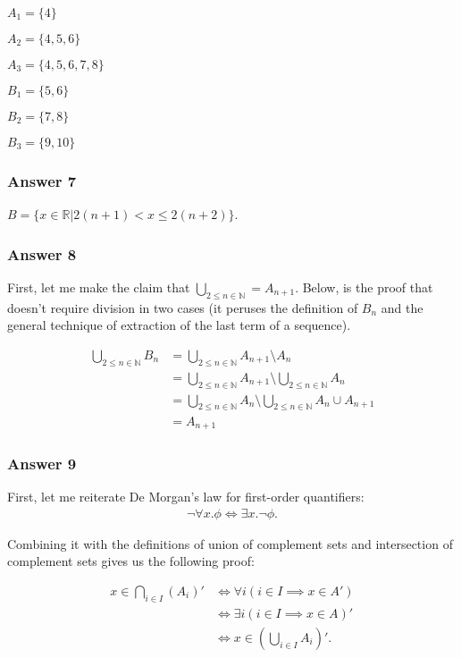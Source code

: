 \documentclass[11pt]{article}
\begin{document}
$A_1=\{4\}$

$A_2=\{4,5,6\}$

$A_3=\{4,5,6,7,8\}$

$B_1=\{5,6\}$

$B_2=\{7,8\}$

$B_3=\{9,10\}$

\subsubsection{Answer 7}
\label{sec-1-4-2}
$B = \{x \in \mathbb{R} | 2(n+1) < x \leq 2(n+2)\}$.
\subsubsection{Answer 8}
\label{sec-1-4-3}
First, let me make the claim that $\bigcup_{2 \leq n \in \mathbb{N}}=A_{n+1}$.
Below, is the proof that doesn't require division in two cases (it peruses
the definition of $B_n$ and the general technique of extraction of the last
term of a sequence).

\begin{equation*}
  \begin{aligned}
    \bigcup_{2 \leq n \in \mathbb{N}} B_n &=
    \bigcup_{2 \leq n \in \mathbb{N}} A_{n+1} \setminus A_n \\
    &= \bigcup_{2 \leq n \in \mathbb{N}} A_{n+1} \setminus
    \bigcup_{2 \leq n \in \mathbb{N}} A_n \\
    &= \bigcup_{2 \leq n \in \mathbb{N}} A_n \setminus
    \bigcup_{2 \leq n \in \mathbb{N}} A_n \cup A_{n+1} \\
    &= A_{n+1}
  \end{aligned}
\end{equation*}
\subsubsection{Answer 9}
\label{sec-1-4-4}
First, let me reiterate De Morgan's law for first-order quantifiers:
\begin{equation*}
  \begin{aligned}
    \lnot \forall x. \phi \iff \exists x. \lnot \phi.
  \end{aligned}
\end{equation*}

Combining it with the definitions of union of complement sets and
intersection of complement sets gives us the following proof:

\begin{equation*}
  \begin{aligned}
    x \in \bigcap_{i \in I} (A_i)'
    &\iff \forall i (i \in I \implies x \in A') \\
    &\iff \exists i (i \in I \implies x \in A)' \\
    &\iff x \in (\bigcup_{i \in I} A_i)'.
  \end{aligned}
\end{equation*}
\end{document}
